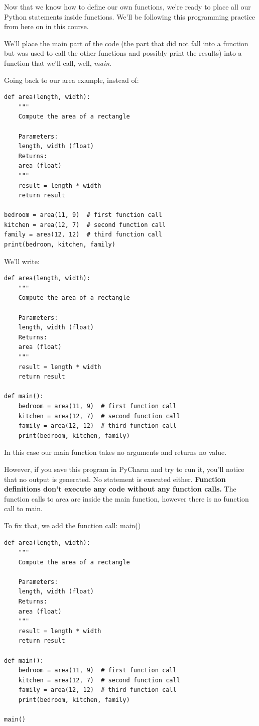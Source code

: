 \documentclass{article}
\begin{document}
Now that we know how to define our own functions, we're ready to place all our Python statements inside functions.  We'll be following this programming practice from here on in this course.

We'll place the main part of the code (the part that did not fall into a function but was used to call the other functions and possibly print the results) into a function that we'll call, well, \textit{main}.  

Going back to our area example, instead of:

\begin{lstlisting}
def area(length, width):
    """
    Compute the area of a rectangle
 
    Parameters:
    length, width (float)
    Returns:
    area (float)
    """
    result = length * width
    return result    
 
bedroom = area(11, 9)  # first function call
kitchen = area(12, 7)  # second function call
family = area(12, 12)  # third function call
print(bedroom, kitchen, family) 
\end{lstlisting}
 
We'll write:

\begin{lstlisting} 
def area(length, width):
    """
    Compute the area of a rectangle
 
    Parameters:
    length, width (float)
    Returns:
    area (float)
    """
    result = length * width
    return result  
 
def main():
    bedroom = area(11, 9)  # first function call
    kitchen = area(12, 7)  # second function call
    family = area(12, 12)  # third function call
    print(bedroom, kitchen, family)
\end{lstlisting}    
    
In this case our main function takes no arguments and returns no value.  

However, if you save this program in PyCharm and try to run it, you'll notice that no output is generated.  No statement is executed either.  \textbf{Function definitions don't execute any code without any function calls.}  The function calls to area are inside the main function, however there is no function call to main.

To fix that, we add the function call: main()

\begin{lstlisting}
def area(length, width):
    """
    Compute the area of a rectangle
 
    Parameters:
    length, width (float)
    Returns:
    area (float)
    """
    result = length * width
    return result  
 
def main():
    bedroom = area(11, 9)  # first function call
    kitchen = area(12, 7)  # second function call
    family = area(12, 12)  # third function call
    print(bedroom, kitchen, family)
 
main()
\end{lstlisting}
\end{document}
